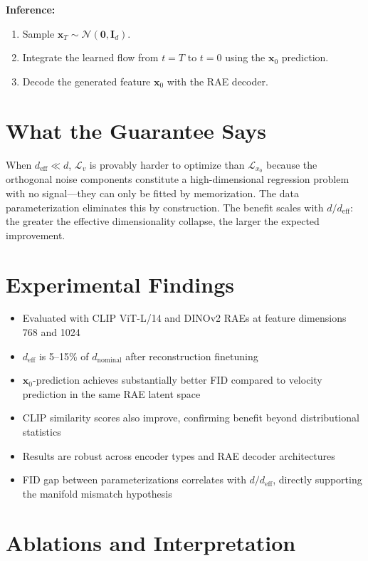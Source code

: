 \documentclass[10pt,twocolumn]{article}
\begin{document}
\textbf{Inference:}
\begin{enumerate}[itemsep=2pt,parsep=0pt]
  \item Sample $\mathbf{x}_T \sim \mathcal{N}(\mathbf{0}, \mathbf{I}_d)$.
  \item Integrate the learned flow from $t=T$ to $t=0$ using the
    $\mathbf{x}_0$ prediction.
  \item Decode the generated feature $\mathbf{x}_0$ with the RAE decoder.
\end{enumerate}

\section{What the Guarantee Says}

When $d_\text{eff} \ll d$, $\mathcal{L}_v$ is provably harder to optimize
than $\mathcal{L}_{x_0}$ because the orthogonal noise components constitute
a high-dimensional regression problem with no signal---they can only be
fitted by memorization. The data parameterization eliminates this by
construction. The benefit scales with $d/d_\text{eff}$: the greater the
effective dimensionality collapse, the larger the expected improvement.

\section{Experimental Findings}

\begin{itemize}[itemsep=2pt,parsep=0pt]
  \item Evaluated with CLIP ViT-L/14 and DINOv2 RAEs at feature dimensions
    768 and 1024
  \item $d_\text{eff}$ is 5--15\% of $d_\text{nominal}$ after reconstruction
    finetuning
  \item $\mathbf{x}_0$-prediction achieves substantially better FID compared
    to velocity prediction in the same RAE latent space
  \item CLIP similarity scores also improve, confirming benefit beyond
    distributional statistics
  \item Results are robust across encoder types and RAE decoder architectures
  \item FID gap between parameterizations correlates with $d/d_\text{eff}$,
    directly supporting the manifold mismatch hypothesis
\end{itemize}

\section{Ablations and Interpretation}
\end{document}
